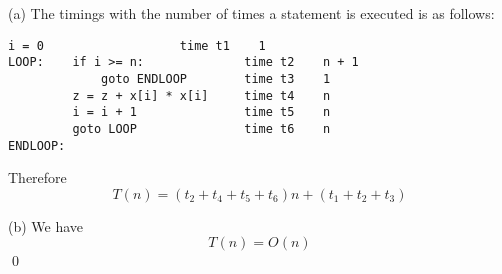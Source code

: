 (a)
The timings with the number of times a statement is executed is as follows:
\begin{Verbatim}[frame=single]
         i = 0                   time t1    1
LOOP:    if i >= n:              time t2    n + 1
             goto ENDLOOP        time t3    1 
         z = z + x[i] * x[i]     time t4    n
         i = i + 1               time t5    n
         goto LOOP               time t6    n
ENDLOOP:
\end{Verbatim}
Therefore
\[
T(n) = (t_2 + t_4 + t_5 + t_6)n + (t_1 + t_2 + t_3)
\]

(b)
We have
\[
T(n) = O(n)
\]
\qed
